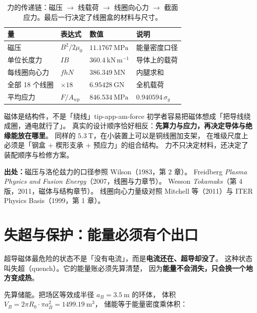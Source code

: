 \begin{table}[htbp]
\centering
\small
\caption{力的传递链：磁压 $\to$ 线载荷 $\to$ 线圈向心力 $\to$ 截面应力。最后一行决定了线圈盒的材料与尺寸。}
\label{tab:app-am-force}
\begin{tabular}{p{3.2cm}p{3.5cm}p{3.4cm}p{3.6cm}}
\toprule
量 & 表达式 & 数值 & 说明 \\
\midrule
磁压 & $B^{2}/2\mu_0$ & $11.1767\ \mathrm{MPa}$ & 能量密度口径 \\
单位长度力 & $IB$ & $360.4\ \mathrm{kN\,m^{-1}}$ & 导体上的载荷 \\
每线圈向心力 & $f h N$ & $386.349\ \mathrm{MN}$ & 内腿求和 \\
全部 18 个线圈 & $\times18$ & $6.95428\ \mathrm{GN}$ & 全机载荷 \\
平均应力 & $F/A_{wp}$ & $846.534\ \mathrm{MPa}$ & $0.940594\,\sigma_y$ \\
\bottomrule
\end{tabular}

\end{table}

\begin{tip}{磁体是结构件，不是「绕线」}{tip-app-am-force}
初学者容易把磁体想成「把导线绕成圈，通电就行了」。
真实的设计顺序恰好相反：\textbf{先算力与应力，再决定导体与绝缘能放在哪里}。
同样的 $5.3\ \mathrm{T}$，在小装置上可以是铜线圈加支架，
在堆级尺度上必须是「钢盒 $+$ 楔形支承 $+$ 预应力」的组合结构。
力不只决定材料，还决定了装配顺序与检修方案。
\end{tip}

{\footnotesize
\textbf{出处：}磁压与洛伦兹力的口径参照 Wilson（1983，第 2 章）。
Freidberg \emph{Plasma Physics and Fusion Energy}（2007，线圈与力章节）。
Wesson \emph{Tokamaks}（第 4 版，2011，磁体与结构章节）。
线圈向心力量级对照 Mitchell 等（2011）与 ITER Physics Basis（1999，第 1 章）。
}

\section{失超与保护：能量必须有个出口}
\label{sec:app-am-quench}

超导磁体最危险的状态不是「没有电流」，而是\textbf{电流还在、超导却没了}。
这种状态叫失超（quench）。它的能量账必须先算清楚，
因为\textbf{能量不会消失，只会换一个地方变成热}。

先算储能。把场区等效成半径 $a_B=3.5\ \mathrm{m}$ 的环体，
体积 $V_B=2\pi R_0\cdot\pi a_B^{2}=1499.19\ \mathrm{m^{3}}$，
储能等于能量密度乘体积：

